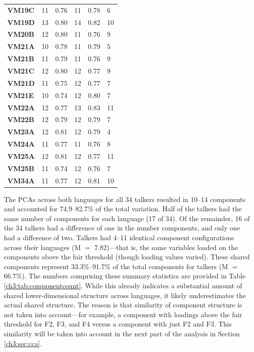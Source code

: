 \begin{table}[ptbh]
{\begin{tabular}{llllll}
    \textbf{VM19C} & 11 & 0.76 & 11 & 0.78 & 6 \\
    \textbf{VM19D} & 13 & 0.80 & 14 & 0.82 & 10 \\
    \textbf{VM20B} & 12 & 0.80 & 11 & 0.76 & 9 \\
    \textbf{VM21A} & 10 & 0.78 & 11 & 0.79 & 5 \\
    \textbf{VM21B} & 11 & 0.79 & 11 & 0.76 & 9 \\
    \textbf{VM21C} & 12 & 0.80 & 12 & 0.77 & 9 \\
    \textbf{VM21D} & 11 & 0.75 & 12 & 0.77 & 7 \\
    \textbf{VM21E} & 10 & 0.74 & 12 & 0.80 & 7 \\
    \textbf{VM22A} & 12 & 0.77 & 13 & 0.83 & 11 \\
    \textbf{VM22B} & 12 & 0.79 & 12 & 0.79 & 7 \\
    \textbf{VM23A} & 12 & 0.81 & 12 & 0.79 & 4 \\
    \textbf{VM24A} & 11 & 0.77 & 11 & 0.76 & 8 \\
    \textbf{VM25A} & 12 & 0.81 & 12 & 0.77 & 11 \\
    \textbf{VM25B} & 11 & 0.74 & 12 & 0.76 & 7 \\
    \textbf{VM34A} & 11 & 0.77 & 12 & 0.81 & 10 \\
    \bottomrule
    \end{tabular}
}
\end{table}

The PCAs across both languages for all 34 talkers resulted in 10--14 components and accounted for 74.9--82.7\% of the total variation. Half of the talkers had the same number of components for each language (17 of 34). Of the remainder, 16 of the 34 talkers had a difference of one in the number components, and only one had a difference of two. Talkers had 4--11 identical component configurations across their languages (M $=$ 7.82)---that is, the same variables loaded on the components above the fair threshold (though loading values varied). These shared components represent 33.3\%--91.7\% of the total components for talkers (M $=$ 66.7\%). The numbers comprising these summary statistics are provided in Table \ref{ch3:tab:componentcount}. While this already indicates a substantial amount of shared lower-dimensional structure across languages, it likely underestimates the actual shared structure. The reason is that similarity of component structure is not taken into account---for example, a component with loadings above the fair threshold for F2, F3, and F4 versus a component with just F2 and F3. This similarity will be taken into account in the next part of the analysis in Section \ref{ch3:sec:cca}. 

